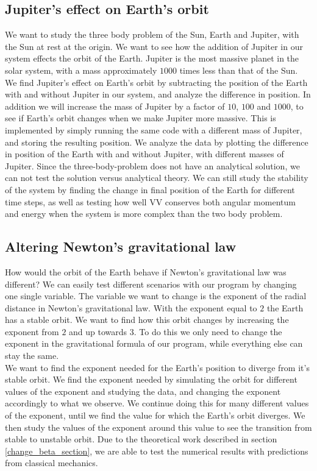\documentclass[%
 reprint,
nofootinbib,
aps,
]{revtex4-1}
\begin{document}
\subsection{Jupiter's effect on Earth's orbit}
We want to study the three body problem of the Sun, Earth and Jupiter, with the Sun at rest at the origin. We want to see how the addition of Jupiter in our system effects the orbit of the Earth. Jupiter is the most massive planet in the solar system, with a mass approximately $1000$ times less than that of the Sun. We find Jupiter's effect on Earth's orbit by subtracting the position of the Earth with and without Jupiter in our system, and analyze the difference in position. In addition we will increase the mass of Jupiter by a factor of $10$, $100$ and $1000$, to see if Earth's orbit changes when we make Jupiter more massive. This is implemented by simply running the same code with a different mass of Jupiter, and storing the resulting position. We analyze the data by plotting the difference in position of the Earth with and without Jupiter, with different masses of Jupiter. Since the three-body-problem does not have an analytical solution, we can not test the solution versus analytical theory. We can still study the stability of the system by finding the change in final position of the Earth for different time steps, as well as testing how well VV conserves both angular momentum and energy when the system is more complex than the two body problem.


\subsection{Altering Newton's gravitational law}
How would the orbit of the Earth behave if Newton's gravitational law was different? We can easily test different scenarios with our program by changing one single variable. The variable we want to change is the exponent of the radial distance in Newton's gravitational law. With the exponent equal to $2$ the Earth has a stable orbit. We want to find how this orbit changes by increasing the exponent from $2$ and up towards $3$. To do this we only need to change the exponent in the gravitational formula of our program, while everything else can stay the same.\\
We want to find the exponent needed for the Earth's position to diverge from it's stable orbit. We find the exponent needed by simulating the orbit for different values of the exponent and studying the data, and changing the exponent accordingly to what we observe. We continue doing this for many different values of the exponent, until we find the value for which the Earth's orbit diverges. We then study the values of the exponent around this value to see the transition from stable to unstable orbit. Due to the theoretical work described in section \vref{change_beta_section}, we are able to test the numerical results with predictions from classical mechanics.
\end{document}
